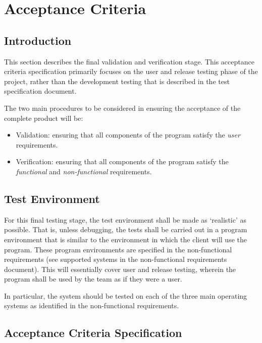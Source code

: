 \documentclass[11pt]{article}
\begin{document}
\section{Acceptance Criteria}\label{acceptance-criteria}

\subsection{Introduction}\label{introduction}

This section describes the final validation and verification stage.
This acceptance criteria specification primarily focuses on the user and
release testing phase of the project, rather than the development
testing that is described in the test specification document.

The two main procedures to be considered in ensuring the acceptance of
the complete product will be:
\begin{itemize}
\item Validation: ensuring that all components
of the program satisfy the \emph{user} requirements.
\item Verification:
ensuring that all components of the program satisfy the
\emph{functional} and \emph{non-functional} requirements.
\end{itemize}

\subsection{Test Environment}\label{test-environment}

For this final testing stage, the test environment shall be made as
`realistic' as possible. That is, unless debugging, the tests shall be
carried out in a program environment that is similar to the environment
in which the client will use the program. These program environments are
specified in the non-functional requirements (see supported systems in
the non-functional requirements document). This will essentially cover
user and release testing, wherein the program shall be used by the team
as if they were a user.

In particular, the system should be tested on each of the three main
operating systems as identified in the non-functional requirements.

\subsection{Acceptance Criteria Specification}\label{acceptance-tests}
\end{document}

